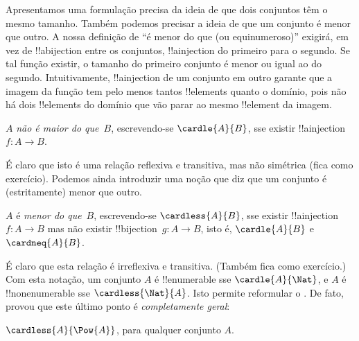 \documentclass[../../../include/open-logic-section]{subfiles}
\begin{document}


\begin{explain}
Apresentamos uma formulação precisa da ideia de que dois conjuntos têm o mesmo
tamanho. Também podemos precisar a ideia de que um conjunto é menor que outro. A
nossa definição de ``é menor do que (ou equinumeroso)'' exigirá, em vez de
!!a{bijection} entre os conjuntos, !!a{injection} do primeiro para o segundo. Se
tal função existir, o tamanho do primeiro conjunto é menor ou igual ao do
segundo. Intuitivamente, !!a{injection} de um conjunto em outro garante que a
imagem da função tem pelo menos tantos !!{element}s quanto o domínio,
pois não há dois !!{element}s do domínio que vão parar ao mesmo !!{element} da
imagem.
\end{explain}

\begin{defn}
$A$ \emph{não é maior do que}~$B$, escrevendo-se $\cardle{A}{B}$, sse existir
!!a{injection} $f \colon A \to B$.
\end{defn}

É claro que isto é uma relação reflexiva e transitiva, mas não simétrica (fica
como exercício). Podemos ainda introduzir uma noção que diz que um conjunto é
(estritamente) menor que outro.

\begin{defn}
$A$ é \emph{menor do que}~$B$, escrevendo-se $\cardless{A}{B}$, sse existir
!!a{injection}~$f\colon A \to B$ mas não existir !!{bijection}~$g\colon A \to B$,
isto é, $\cardle{A}{B}$ e $\cardneq{A}{B}$.
\end{defn}

É claro que esta relação é irreflexiva e transitiva. (Também fica como
exercício.) Com esta notação, um conjunto $A$ é !!{enumerable} sse
$\cardle{A}{\Nat}$, e $A$ é !!{nonenumerable} sse $\cardless{\Nat}{A}$. Isto
permite reformular o
. De fato,
\citet{Cantor1892} provou que este último ponto é \emph{completamente geral}:

\begin{thm}[Cantor]
$\cardless{A}{\Pow{A}}$, para qualquer conjunto $A$.
\end{thm}
\end{document}
